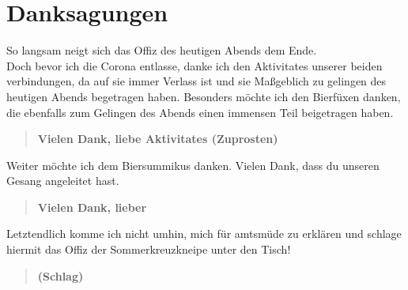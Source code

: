 \newpage
\section{Danksagungen}
So langsam neigt sich das Offiz des heutigen Abends dem Ende.\\
Doch bevor ich die Corona entlasse, danke ich den Aktivitates
unserer beiden verbindungen, da auf sie immer Verlass ist und
sie Maßgeblich zu gelingen des heutigen Abends begetragen haben.
Besonders möchte ich den Bierfüxen danken, die ebenfalls zum
Gelingen des Abends einen immensen Teil beigetragen haben.
\begin{quote}
    \textbf{Vielen Dank, liebe Aktivitates (Zuprosten)}
\end{quote}
Weiter möchte ich dem Biersummikus danken. Vielen Dank, dass du unseren
Gesang angeleitet hast.
\begin{quote}
    \textbf{Vielen Dank, lieber}
\end{quote}

Letztendlich komme ich nicht umhin, mich für amtsmüde zu erklären
und schlage hiermit das Offiz der Sommerkreuzkneipe unter den Tisch!
\begin{quote}
    \textbf{(Schlag)}
\end{quote}